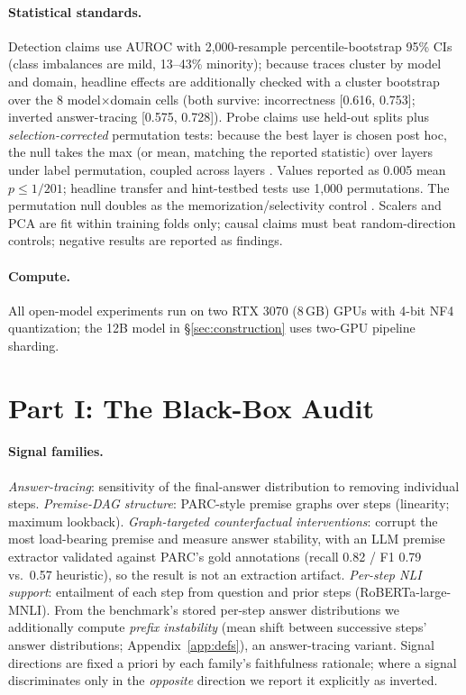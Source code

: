 \documentclass[11pt]{article}
\begin{document}
\paragraph{Statistical standards.} Detection claims use AUROC with 2{,}000-resample percentile-bootstrap 95\% CIs (class imbalances are mild, 13--43\% minority); because traces cluster by model and domain, headline effects are additionally checked with a cluster bootstrap over the 8 model$\times$domain cells (both survive: incorrectness [0.616, 0.753]; inverted answer-tracing [0.575, 0.728]). Probe claims use held-out splits plus \emph{selection-corrected} permutation tests: because the best layer is chosen post hoc, the null takes the max (or mean, matching the reported statistic) over layers under label permutation, coupled across layers \citep[formal statements in Appendix~\ref{app:defs}]{nichols2002nonparametric}. Values reported as 0.005 mean $p \leq 1/201$; headline transfer and hint-testbed tests use 1{,}000 permutations. The permutation null doubles as the memorization/selectivity control \citep{belinkov2022probing}. Scalers and PCA are fit within training folds only; causal claims must beat random-direction controls; negative results are reported as findings.

\paragraph{Compute.} All open-model experiments run on two RTX 3070 (8\,GB) GPUs with 4-bit NF4 quantization; the 12B model in \S\ref{sec:construction} uses two-GPU pipeline sharding.

\section{Part I: The Black-Box Audit}
\label{sec:audit}

\paragraph{Signal families.} \emph{Answer-tracing}: sensitivity of the final-answer distribution to removing individual steps. \emph{Premise-DAG structure}: PARC-style premise graphs over steps (linearity; maximum lookback). \emph{Graph-targeted counterfactual interventions}: corrupt the most load-bearing premise and measure answer stability, with an LLM premise extractor validated against PARC's gold annotations (recall 0.82 / F1 0.79 vs.\ 0.57 heuristic), so the result is not an extraction artifact. \emph{Per-step NLI support}: entailment of each step from question and prior steps (RoBERTa-large-MNLI). From the benchmark's stored per-step answer distributions we additionally compute \emph{prefix instability} (mean shift between successive steps' answer distributions; Appendix~\ref{app:defs}), an answer-tracing variant. Signal directions are fixed a priori by each family's faithfulness rationale; where a signal discriminates only in the \emph{opposite} direction we report it explicitly as inverted.
\end{document}
